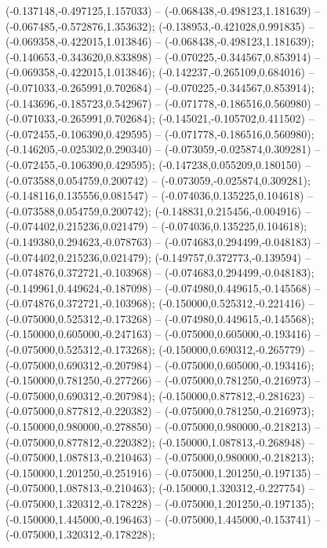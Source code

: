  (-0.137148,-0.497125,1.157033) -- (-0.068438,-0.498123,1.181639) -- (-0.067485,-0.572876,1.353632);
 (-0.138953,-0.421028,0.991835) -- (-0.069358,-0.422015,1.013846) -- (-0.068438,-0.498123,1.181639);
 (-0.140653,-0.343620,0.833898) -- (-0.070225,-0.344567,0.853914) -- (-0.069358,-0.422015,1.013846);
 (-0.142237,-0.265109,0.684016) -- (-0.071033,-0.265991,0.702684) -- (-0.070225,-0.344567,0.853914);
 (-0.143696,-0.185723,0.542967) -- (-0.071778,-0.186516,0.560980) -- (-0.071033,-0.265991,0.702684);
 (-0.145021,-0.105702,0.411502) -- (-0.072455,-0.106390,0.429595) -- (-0.071778,-0.186516,0.560980);
 (-0.146205,-0.025302,0.290340) -- (-0.073059,-0.025874,0.309281) -- (-0.072455,-0.106390,0.429595);
 (-0.147238,0.055209,0.180150) -- (-0.073588,0.054759,0.200742) -- (-0.073059,-0.025874,0.309281);
 (-0.148116,0.135556,0.081547) -- (-0.074036,0.135225,0.104618) -- (-0.073588,0.054759,0.200742);
 (-0.148831,0.215456,-0.004916) -- (-0.074402,0.215236,0.021479) -- (-0.074036,0.135225,0.104618);
 (-0.149380,0.294623,-0.078763) -- (-0.074683,0.294499,-0.048183) -- (-0.074402,0.215236,0.021479);
 (-0.149757,0.372773,-0.139594) -- (-0.074876,0.372721,-0.103968) -- (-0.074683,0.294499,-0.048183);
 (-0.149961,0.449624,-0.187098) -- (-0.074980,0.449615,-0.145568) -- (-0.074876,0.372721,-0.103968);
 (-0.150000,0.525312,-0.221416) -- (-0.075000,0.525312,-0.173268) -- (-0.074980,0.449615,-0.145568);
 (-0.150000,0.605000,-0.247163) -- (-0.075000,0.605000,-0.193416) -- (-0.075000,0.525312,-0.173268);
 (-0.150000,0.690312,-0.265779) -- (-0.075000,0.690312,-0.207984) -- (-0.075000,0.605000,-0.193416);
 (-0.150000,0.781250,-0.277266) -- (-0.075000,0.781250,-0.216973) -- (-0.075000,0.690312,-0.207984);
 (-0.150000,0.877812,-0.281623) -- (-0.075000,0.877812,-0.220382) -- (-0.075000,0.781250,-0.216973);
 (-0.150000,0.980000,-0.278850) -- (-0.075000,0.980000,-0.218213) -- (-0.075000,0.877812,-0.220382);
 (-0.150000,1.087813,-0.268948) -- (-0.075000,1.087813,-0.210463) -- (-0.075000,0.980000,-0.218213);
 (-0.150000,1.201250,-0.251916) -- (-0.075000,1.201250,-0.197135) -- (-0.075000,1.087813,-0.210463);
 (-0.150000,1.320312,-0.227754) -- (-0.075000,1.320312,-0.178228) -- (-0.075000,1.201250,-0.197135);
 (-0.150000,1.445000,-0.196463) -- (-0.075000,1.445000,-0.153741) -- (-0.075000,1.320312,-0.178228);
